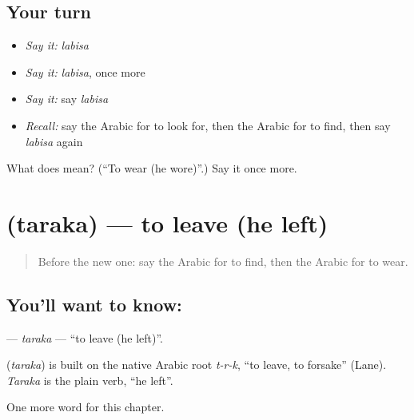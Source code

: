 \subsection*{Your turn}
\begin{itemize}
\raggedright
  \item \emph{Say it:} \emph{labisa}
  \item \emph{Say it:} \emph{labisa}, once more
  \item \emph{Say it:} say \emph{labisa}
  \item \emph{Recall:} say the Arabic for to look for, then the Arabic for to find, then say \emph{labisa} again
\end{itemize}

\begin{tcolorbox}[breakable,colback=teal!4,colframe=teal!35!black,title={Before you move on}]
What does  mean? (\textquotedblleft{}To wear (he wore)\textquotedblright{}.) Say it once more.
\end{tcolorbox}
\section[\texorpdfstring{\ar{ترك} (taraka)}{ترك (taraka)}]{ (taraka) — to leave (he left)}

\label{lesson:AR-C62-taraka}



\begin{quote}
Before the new one: say the Arabic for to find, then the Arabic for to wear.
\end{quote}

\subsection*{You'll want to know: }
\textbf{} — \emph{taraka} — \textquotedblleft{}to leave (he left)\textquotedblright{}.

\begin{cousinweb}
\textbf{} (\emph{taraka}) is built on the native Arabic root \emph{t-r-k}, \textquotedblleft{}to leave, to forsake\textquotedblright{} (Lane). \emph{Taraka} is the plain verb, \textquotedblleft{}he left\textquotedblright{}.
\end{cousinweb}

\begin{grammarlens}[title={What you've built}]
One more word for this chapter.
\end{grammarlens}

